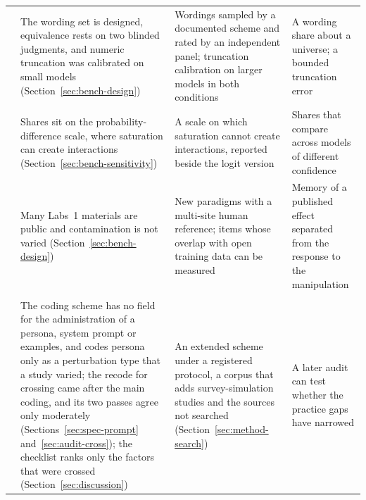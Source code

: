 {\begin{tabular}{@{}>{\raggedright\arraybackslash}p{}>{\raggedright\arraybackslash}p{}>{\raggedright\arraybackslash}p{}>{\raggedright\arraybackslash}p{}@{}}
6 & The wording set is designed, equivalence rests on two blinded judgments, and numeric truncation was calibrated on small models (Section~\ref{sec:bench-design}) & Wordings sampled by a documented scheme and rated by an independent panel; truncation calibration on larger models in both conditions & A wording share about a universe; a bounded truncation error \\
7 & Shares sit on the probability-difference scale, where saturation can create interactions (Section~\ref{sec:bench-sensitivity}) & A scale on which saturation cannot create interactions, reported beside the logit version & Shares that compare across models of different confidence \\
8 & Many Labs~1 materials are public and contamination is not varied (Section~\ref{sec:bench-design}) \cite{balloccu2024leak,magar2022contamination} & New paradigms with a multi-site human reference; items whose overlap with open training data can be measured & Memory of a published effect separated from the response to the manipulation \\
\addlinespace[3pt]
\multicolumn{4}{@{}l}{\textit{How the field can check both}} \\
9 & The coding scheme has no field for the administration of a persona, system prompt or examples, and codes persona only as a perturbation type that a study varied; the recode for crossing came after the main coding, and its two passes agree only moderately (Sections~\ref{sec:spec-prompt} and~\ref{sec:audit-cross}); the checklist ranks only the factors that were crossed (Section~\ref{sec:discussion}) & An extended scheme under a registered protocol, a corpus that adds survey-simulation studies and the sources not searched (Section~\ref{sec:method-search}) & A later audit can test whether the practice gaps have narrowed \\
\bottomrule
\end{tabular}}
